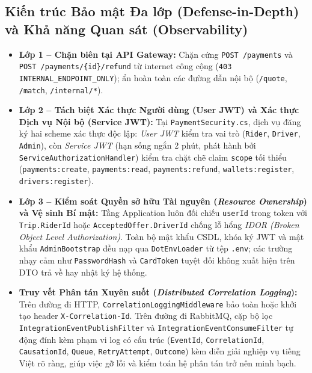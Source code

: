 \documentclass[12pt,a4paper]{article}
\begin{document}
\subsection{Kiến trúc Bảo mật Đa lớp (Defense-in-Depth) và Khả năng Quan sát (Observability)}
\begin{itemize}[leftmargin=1.5em]
    \item \textbf{Lớp 1 -- Chặn biên tại API Gateway:} Chặn cứng \texttt{POST /payments} và \texttt{POST /payments/\{id\}/refund} từ internet công cộng (\texttt{403 INTERNAL\_ENDPOINT\_ONLY}); ẩn hoàn toàn các đường dẫn nội bộ (\texttt{/quote}, \texttt{/match}, \texttt{/internal/*}).
    \item \textbf{Lớp 2 -- Tách biệt Xác thực Người dùng (User JWT) và Xác thực Dịch vụ Nội bộ (Service JWT):} Tại \texttt{PaymentSecurity.cs}, dịch vụ đăng ký hai scheme xác thực độc lập: \textit{User JWT} kiểm tra vai trò (\texttt{Rider}, \texttt{Driver}, \texttt{Admin}), còn \textit{Service JWT} (hạn sống ngắn 2 phút, phát hành bởi \texttt{ServiceAuthorizationHandler}) kiểm tra chặt chẽ claim \texttt{scope} tối thiểu (\texttt{payments:create}, \texttt{payments:read}, \texttt{payments:refund}, \texttt{wallets:register}, \texttt{drivers:register}).
    \item \textbf{Lớp 3 -- Kiểm soát Quyền sở hữu Tài nguyên (\textit{Resource Ownership}) và Vệ sinh Bí mật:} Tầng Application luôn đối chiếu \texttt{userId} trong token với \texttt{Trip.RiderId} hoặc \texttt{AcceptedOffer.DriverId} chống lỗ hổng \textit{IDOR (Broken Object Level Authorization)}. Toàn bộ mật khẩu CSDL, khóa ký JWT và mật khẩu \texttt{AdminBootstrap} đều nạp qua \texttt{DotEnvLoader} từ tệp \texttt{.env}; các trường nhạy cảm như \texttt{PasswordHash} và \texttt{CardToken} tuyệt đối không xuất hiện trên DTO trả về hay nhật ký hệ thống.
    \item \textbf{Truy vết Phân tán Xuyên suốt (\textit{Distributed Correlation Logging}):} Trên đường đi HTTP, \texttt{CorrelationLoggingMiddleware} bảo toàn hoặc khởi tạo header \texttt{X-Correlation-Id}. Trên đường đi RabbitMQ, cặp bộ lọc \texttt{IntegrationEventPublishFilter} và \texttt{IntegrationEventConsumeFilter} tự động đính kèm phạm vi log có cấu trúc (\texttt{EventId}, \texttt{CorrelationId}, \texttt{CausationId}, \texttt{Queue}, \texttt{RetryAttempt}, \texttt{Outcome}) kèm diễn giải nghiệp vụ tiếng Việt rõ ràng, giúp việc gỡ lỗi và kiểm toán hệ phân tán trở nên minh bạch.
\end{itemize}

\end{document}
